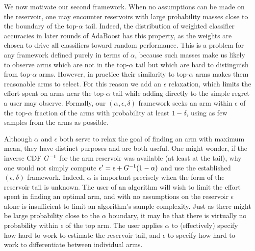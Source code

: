 We now motivate our second framework.
When no assumptions can be made on the reservoir, one may encounter
reservoirs with large probability masses close to the boundary of
the
top-$\alpha$ tail.
Indeed, the distribution of weighted classifier accuracies in later rounds of 
AdaBoost has this property, as the weights are chosen to drive all 
classifiers toward random performance.
This is a problem for any framework defined purely in terms of $\alpha$, because
such masses make us likely to observe arms which are
not in the top-$\alpha$ tail but which are hard to distinguish from
top-$\alpha$ arms.
However, in practice their similarity to top-$\alpha$ arms makes them reasonable arms to
select.
For this reason we add an $\epsilon$ relaxation, which
limits the effort spent on
arms near the top-$\alpha$ tail
while adding directly to the simple regret a user may observe.
Formally, our $(\alpha,\epsilon, \delta)$ framework seeks
an arm within $\epsilon$ of the top-$\alpha$ fraction of the arms with
probability at least $1-\delta$,
using as few samples from the arms as possible.

Although $\alpha$ and $\epsilon$ both serve to relax
the goal of finding an arm with maximum mean,
they have distinct purposes and are both useful.
One might wonder,
if the inverse CDF $G^{-1}$ for the arm reservoir was available
(at least at the tail), why one would not simply compute
$\epsilon'=\epsilon+G^{-1}(1-\alpha)$ and use the
established $(\epsilon,\delta)$ framework.
Indeed, $\alpha$ is important precisely when 
the form of the reservoir tail is unknown.
The user of an algorithm will wish to limit the effort spent in finding an optimal arm,
and with no assumptions on the reservoir $\epsilon$ alone is insufficient
to limit an algorithm's sample complexity.
Just as there might be large probability close to the $\alpha$ boundary,
it may be that there is virtually no probability within $\epsilon$ of
the top arm.
The user applies
$\alpha$ to (effectively) specify how hard to work to
estimate the reservoir tail,
and $\epsilon$ to specify how hard to work to
differentiate between individual arms.

